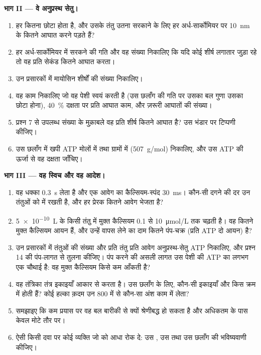 \begin{problem}
\medskip
\noindent\textbf{भाग II --- वे अनुप्रस्थ सेतु।}
\begin{enumerate}[resume]
  \item हर  कितना छोटा होता है, और उसके तंतु उतना सरकाने के लिए
        हर अर्ध-सार्कोमियर पर \qty{10}{nm} के कितने आघात
        करने पड़ते हैं?
  \item हर अर्ध-सार्कोमियर में सरकने की गति और वह
        संख्या निकालिए कि यदि कोई शीर्ष लगातार जुड़ा रहे तो वह प्रति सेकंड कितने
        आघात करता।
  \item उन प्रसारकों में मायोसिन शीर्षों की संख्या निकालिए।
  \item वह काम निकालिए जो वह पेशी स्वयं करती है (उस
        छलाँग की गति पर उसका बल गुणा उसका छोटा होना), \qty{40}{\%} दक्षता पर
        प्रति आघात काम, और ज़रूरी आघातों की संख्या।
  \item प्रश्न 7 से उपलब्ध संख्या के मुक़ाबले वह प्रति शीर्ष कितने आघात
        है? उस भंडार पर टिप्पणी कीजिए।
  \item उस छलाँग में खपी ATP मोलों में तथा ग्रामों में
        (\qty{507}{g/mol}) निकालिए, और उस ATP की ऊर्जा से वह दक्षता जाँचिए।
\end{enumerate}

\medskip
\noindent\textbf{भाग III --- वह स्विच और वह आदेश।}
\begin{enumerate}[resume]
  \item वह धक्का \qty{0.3}{s} लेता है और एक आवेग का कैल्सियम-स्पंद
        \qty{30}{ms}। कौन-सी दगने की दर उन तंतुओं को
         में रखती है, और हर प्रेरक  कितने आवेग भेजता है?
  \item \qty{5e-10}{L} के किसी तंतु में मुक्त कैल्सियम \qty{0.1}{} से
        \qty{10}{\micro mol/L} तक चढ़ती है। वह कितने मुक्त कैल्सियम आयन
        हैं, और उन्हें वापस लेने का दाम कितने पंप-चक्र
        (प्रति ATP दो आयन) है?
  \item उन प्रसारकों में तंतुओं की संख्या और प्रति तंतु प्रति आवेग
        अनुप्रस्थ-सेतु ATP निकालिए, और प्रश्न 14 की
        पंप-लागत से तुलना कीजिए। पंप करने की असली लागत उस पेशी की ATP का लगभग
        एक चौथाई है: वह मुक्त कैल्सियम किसे कम आँकती है?
  \item वह तंत्रिका तंत्र इकाइयाँ आकार से  करता है। उस छलाँग के लिए,
        कौन-सी इकाइयाँ और किस क्रम में  होती हैं? कोई हल्का क़दम उन
        \num{800} में से कौन-सा अंश काम में लेता?
  \item समझाइए कि कम प्रयास पर वह बल बारीकी से क्यों श्रेणीबद्ध हो सकता है और
        अधिकतम के पास केवल मोटे तौर पर।
  \item ऐसी किसी दवा पर कोई व्यक्ति जो  को
        आधा रोक दे: उस , उस  तथा उस छलाँग की भविष्यवाणी कीजिए।
\end{enumerate}


\end{problem}
